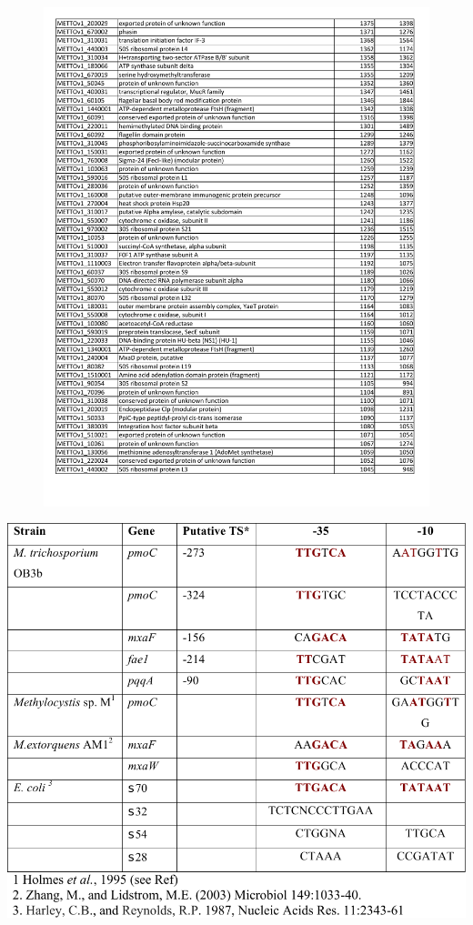\begin{figure}[H]
\centering
    \includegraphics[width=1.0\textwidth]{./tex/chapter1/figures/supplemental/TableS2d.pdf}
\end{figure}


\begin{table}[H]
\caption{Summary of putative transcription site mapping
	}
\label{table:ChA_S3}
\includegraphics[width=1.0\textwidth]{./tex/chapter1/figures/supplemental/TableS3.pdf}
\end{table}

